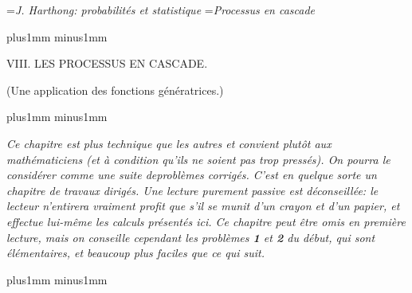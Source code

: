




\auteurcourant={\sl J. Harthong: probabilit\'es et statistique}
\titrecourant={\sl Processus en cascade}


\def\hfq{\hfill\quad}
\def\cc#1{\hfill#1\quad\hfill}
\def\tv{\vrule height 30pt depth 6pt width0.4pt}
\def\punkt{\vrule height0.4pt depth0pt width0.4pt}
\def\L{{\bb L}} 

\def\ara{\hskip-1.5pt}
\def\asa{\hskip-2pt}
\def\ata{\hskip-2.5pt}
\def\aua{\hskip-1pt}
\def\arb{\hskip1.5pt}
\def\asb{\hskip2pt}
\def\atb{\hskip2.5pt}
\def\aub{\hskip1pt}
\def\xsp{\hskip3pt plus3pt minus2pt} 

\null\vskip 10mm plus1mm minus1mm

\centerline {\tit VIII. LES PROCESSUS EN CASCADE.} 
\medskip 
\centerline {\tit (Une application des fonctions g\'en\'eratrices.)} 

\vskip10mm plus1mm minus1mm

{\narrower\eightpoint\sl Ce chapitre est plus technique que les autres 
et convient plut\^ot aux math\'e\-ma\-ti\-ciens (et \`a condition qu'ils ne
soient pas trop press\'es). On pourra le
consid\'erer comme une suite deprobl\`emes corrig\'es. C'est 
en quelque sorte un chapitre de travaux dirig\'es. Une lecture purement
passive est d\'econseill\'ee: le lecteur n'entirera vraiment profit que s'il  se munit d'un crayon et d'un papier, et 
effectue lui-m\^eme les
calculs pr\'esent\'es ici. 
\medskip 
Ce chapitre peut \^etre omis en premi\`ere lecture, mais on conseille
cependant les probl\`emes {\bf 1} et {\bf 2} du d\'ebut, qui sont
\'el\'ementaires,  et beaucoup plus faciles que ce qui suit. \par}

\vskip7mm plus1mm minus1mm


